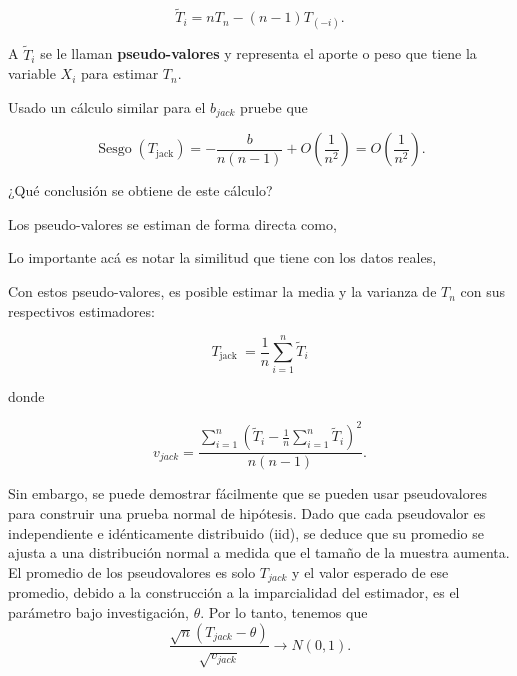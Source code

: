 \documentclass[12pt]{book}\usepackage[]{graphicx}\usepackage[]{color}
\theoremstyle{definition}
\theoremstyle{plain}
\begin{document}
\[
\widetilde{T}_{i}=n T_{n}-(n-1) T_{(-i)}.
\]

\begin{nota}{}{}
    A \(\widetilde{T}_{i}\) se le llaman \textbf{pseudo-valores} y
    representa el aporte o peso que tiene la variable \(X_{i}\) para
    estimar \(T_{n}\).
\end{nota}

\begin{tarea}{}{}
    Usado un cálculo similar para el \(b_{jack}\) pruebe que

    \[
    \operatorname{Sesgo}\left(T_{\text {jack}
    }\right)=-\frac{b}{n(n-1)}+O\left(\frac{1}{n^{2}}\right)=O\left(\frac{1}{n^{2}}\right).
    \]

    ¿Qué conclusión se obtiene de este cálculo?
\end{tarea}


\begin{laboratorio}{}{}
    Los pseudo-valores se estiman de forma directa como,




    Lo importante acá es notar la similitud que tiene con los datos
    reales,



\end{laboratorio}

Con estos pseudo-valores, es posible estimar la media y la varianza de
\(T_{n}\) con sus respectivos estimadores:

\[
T_{\text {jack }}=\frac{1}{n} \sum_{i=1}^{n} \widetilde{T}_{i}
\]

donde

\[
v_{jack}=\frac{\sum_{i=1}^{n}\left(\widetilde{T}_{i}-\frac{1}{n}
    \sum_{i=1}^{n} \widetilde{T}_{i}\right)^{2}}{n(n-1)}.
\]



\begin{nota}{}{}

    Sin embargo, se puede demostrar fácilmente que se pueden usar
    pseudovalores para construir una prueba normal de hipótesis. Dado que
    cada pseudovalor es independiente e idénticamente distribuido (iid),
    se deduce que su promedio se ajusta a una distribución normal a medida
    que el tamaño de la muestra aumenta. El promedio de los pseudovalores
    es solo \(T_ {jack}\) y el valor esperado de ese promedio, debido a la
    construcción a la imparcialidad del estimador, es el parámetro bajo
    investigación, \(\theta \). Por lo tanto, tenemos que
    \[
    \frac{\sqrt{n}\left(T_{jack}-\theta\right)}{\sqrt{v_{jack}}}
    \rightarrow N(0,1).
    \]
\end{nota}
\end{document}
